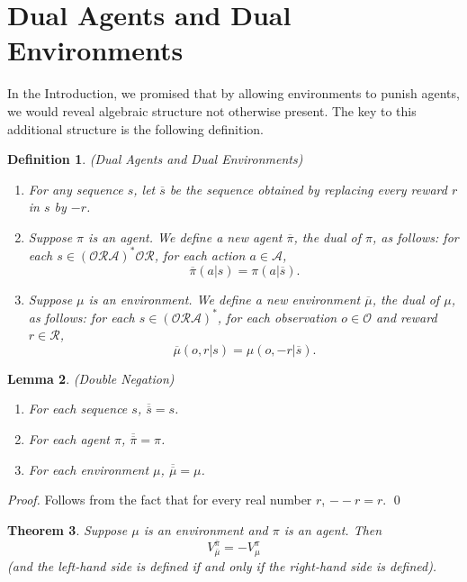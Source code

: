 \documentclass[runningheads]{llncs}
\newtheorem{mytheorem}{Theorem}
\newtheorem{mydefinition}[mytheorem]{Definition}
\newtheorem{mylemma}[mytheorem]{Lemma}
\begin{document}
\section{Dual Agents and Dual Environments}
\label{dualsection}

In the Introduction, we promised that by allowing environments to punish agents,
we would reveal algebraic structure not otherwise present. The key to this additional
structure is the following definition.

\begin{mydefinition}
(Dual Agents and Dual Environments)
\begin{enumerate}
    \item
    For any sequence $s$, let $\overline s$ be the sequence obtained
    by replacing every reward $r$ in $s$ by $-r$.
    \item
    Suppose $\pi$ is an agent.
    We define a new agent $\overline \pi$, the \emph{dual} of $\pi$,
    as follows:
    for each $s\in (\mathcal O\mathcal R\mathcal A)^*\mathcal O\mathcal R$,
    for each action $a\in\mathcal A$,
    \[\overline\pi(a|s)=\pi(a|\overline s).\]
    \item
    Suppose $\mu$ is an environment.
    We define a new environment $\overline\mu$, the \emph{dual} of $\mu$,
    as follows:
    for each $s\in (\mathcal O\mathcal R\mathcal A)^*$,
    for each observation $o\in\mathcal O$
    and reward $r\in\mathcal R$,
    \[\overline\mu(o,r|s)=\mu(o,-r|\overline s).\]
\end{enumerate}
\end{mydefinition}

\begin{mylemma}
\label{doublesubtractionlemma}
(Double Negation)
    \begin{enumerate}
        \item For each sequence $s$, $\overline{\overline s}=s$.
        \item For each agent $\pi$, $\overline{\overline \pi}=\pi$.
        \item For each environment $\mu$, $\overline{\overline \mu}=\mu$.
    \end{enumerate}
\end{mylemma}

\begin{proof}
    Follows from the fact that for every real number $r$, $--r=r$.
    \qed
\end{proof}

\begin{mytheorem}
\label{bigtheorem}
    Suppose $\mu$ is an environment and $\pi$ is an agent.
    Then
    \[
        V^{\overline \pi}_{\overline \mu}=-V^\pi_\mu
    \]
    (and the left-hand side is defined if and only if the right-hand side is defined).
\end{mytheorem}
\end{document}
